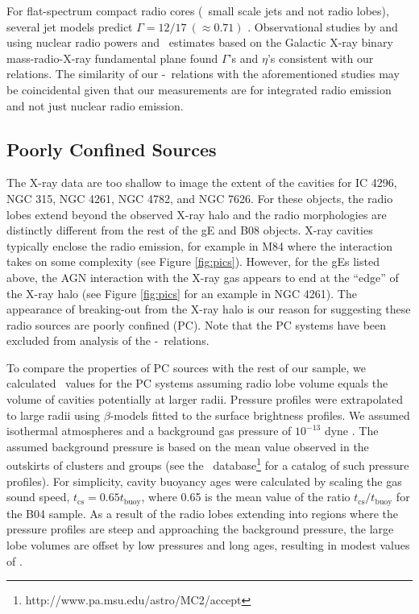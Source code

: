 \documentclass{emulateapj}
\begin{document}
For flat-spectrum compact radio cores (\ie\ small scale jets and not
radio lobes), several jet models predict $\Gamma = 12/17 ~(\approx
0.71)$ \citep{1979ApJ...232...34B, 1995A&A...293..665F,
  2003MNRAS.343L..59H}. Observational studies by
\citet{2005ApJ...633..384H} and \citet{2007MNRAS.381..589M} using
nuclear radio powers and \pjet\ estimates based on the Galactic X-ray
binary mass-radio-X-ray fundamental plane \citep{2003MNRAS.344...60G,
  2003MNRAS.345.1057M} found $\Gamma$'s and $\eta$'s consistent with
our relations. The similarity of our \pjet-\prad\ relations with the
aforementioned studies may be coincidental given that our measurements
are for integrated radio emission and not just nuclear radio emission.

\subsection{Poorly Confined Sources}
\label{sec:jet}

The X-ray data are too shallow to image the extent of the cavities for
IC 4296, NGC 315, NGC 4261, NGC 4782, and NGC 7626. For these objects,
the radio lobes extend beyond the observed X-ray halo and the radio
morphologies are distinctly different from the rest of the gE and B08
objects. X-ray cavities typically enclose the radio emission, for
example in M84 \citep{2008ApJ...686..911F} where the interaction takes
on some complexity (see Figure \ref{fig:pics}). However, for the gEs
listed above, the AGN interaction with the X-ray gas appears to end at
the ``edge'' of the X-ray halo (see Figure \ref{fig:pics} for an
example in NGC 4261). The appearance of breaking-out from the X-ray
halo is our reason for suggesting these radio sources are poorly
confined (PC). Note that the PC systems have been excluded from
analysis of the \pjet-\prad\ relations.

To compare the properties of PC sources with the rest of our sample,
we calculated \pcav\ values for the PC systems assuming radio lobe
volume equals the volume of cavities potentially at larger
radii. Pressure profiles were extrapolated to large radii using
$\beta$-models \citep{betamodel} fitted to the surface brightness
profiles. We assumed isothermal atmospheres and a background gas
pressure of $10^{-13}$ dyne \pcmsq. The assumed background pressure is
based on the mean value observed in the outskirts of clusters and
groups (see the
\accept\ database\footnote{http://www.pa.msu.edu/astro/MC2/accept} for
a catalog of such pressure profiles). For simplicity, cavity buoyancy
ages were calculated by scaling the gas sound speed, $t_{\mathrm{cs}}
= 0.65 t_{\mathrm{buoy}}$, where 0.65 is the mean value of the ratio
$t_{\mathrm{cs}}/t_{\mathrm{buoy}}$ for the B04 sample. As a result of
the radio lobes extending into regions where the pressure profiles are
steep and approaching the background pressure, the large lobe volumes
are offset by low pressures and long ages, resulting in modest values
of \pcav.
\end{document}
